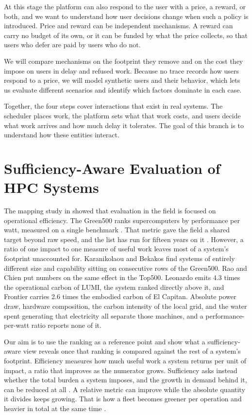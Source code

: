 At this stage the platform can also respond to the user with a price, a reward, or both, and we want to understand how user decisions change when such a policy is introduced. Price and reward can be independent mechanisms. A reward can carry no budget of its own, or it can be funded by what the price collects, so that users who defer are paid by users who do not.

We will compare mechanisms on the footprint they remove and on the cost they impose on users in delay and refused work. Because no trace records how users respond to a price, we will model synthetic users and their behavior, which lets us evaluate different scenarios and identify which factors dominate in each case.

Together, the four steps cover interactions that exist in real systems. The scheduler places work, the platform sets what that work costs, and users decide what work arrives and how much delay it tolerates. The goal of this branch is to understand how these entities interact.

\section{Sufficiency-Aware Evaluation of HPC Systems}
\label{sec:plan-evaluation}

The mapping study in  showed that evaluation in the field is focused on operational efficiency. The Green500 ranks supercomputers by performance per watt, measured on a single benchmark \parencite{feng2007Green500}. That metric gave the field a shared target beyond raw speed, and the list has run for fifteen years on it \parencite{adhinarayanan2025Looking}. However, a ratio of one impact to one measure of useful work leaves most of a system's footprint unaccounted for. Karanikolaou and Bekakos \parencite{karanikolaou2022Action} find systems of entirely different size and capability sitting on consecutive rows of the Green500. Rao and Chien \parencite{rao2025Modeling} put numbers on the same effect in the Top500. Leonardo emits 4.3 times the operational carbon of LUMI, the system ranked directly above it, and Frontier carries 2.6 times the embodied carbon of El Capitan. Absolute power draw, hardware composition, the carbon intensity of the local grid, and the water spent generating that electricity all separate those machines, and a performance-per-watt ratio reports none of it.

Our aim is to use the ranking as a reference point and show what a sufficiency-aware view reveals once that ranking is compared against the rest of a system's footprint. Efficiency measures how much useful work a system returns per unit of impact, a ratio that improves as the numerator grows. Sufficiency asks instead whether the total burden a system imposes, and the growth in demand behind it, can be reduced at all \parencite{santarius2022Digital}. A relative metric can improve while the absolute quantity it divides keeps growing. That is how a fleet becomes greener per operation and heavier in total at the same time \parencite{york2022Rebound}.

